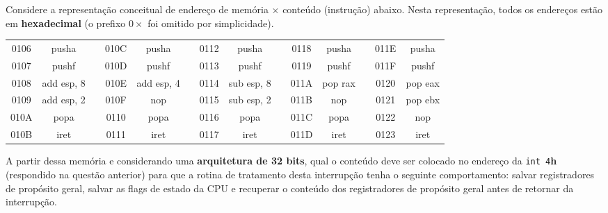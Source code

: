 {\begin{question}{}
Considere a representação conceitual de endereço de memória $\times$ conteúdo (instrução) abaixo. Nesta representação, todos os endereços estão em \textbf{hexadecimal} (o prefixo $0\times$ foi omitido por simplicidade).
\begin{center}
{\ttfamily
\begin{tabular}{|c|c|c|c|c|c|c|c|c|c|c|l|c|c|}
\cline{1-2} \cline{4-5} \cline{7-8} \cline{10-11} \cline{13-14}
0106 & pusha &  & 010C & pusha &  & 0112 & pusha &  & 0118 & pusha &  & 011E & pusha \\ \cline{1-2} \cline{4-5} \cline{7-8} \cline{10-11} \cline{13-14} 
0107 & pushf &  & 010D & pushf &  & 0113 & pushf &  & 0119 & pushf &  & 011F & pushf \\ \cline{1-2} \cline{4-5} \cline{7-8} \cline{10-11} \cline{13-14} 
0108 & add esp, 8 &  & 010E & add esp, 4 &  & 0114 & sub esp, 8 &  & 011A & pop rax &  & 0120 & pop eax \\ \cline{1-2} \cline{4-5} \cline{7-8} \cline{10-11} \cline{13-14} 
0109 & add esp, 2 &  & 010F & nop &  & 0115 & sub esp, 2 &  & 011B & nop &  & 0121 & pop ebx \\ \cline{1-2} \cline{4-5} \cline{7-8} \cline{10-11} \cline{13-14} 
010A & popa &  & 0110 & popa &  & 0116 & popa &  & 011C & popa &  & 0122 & nop \\ \cline{1-2} \cline{4-5} \cline{7-8} \cline{10-11} \cline{13-14} 
010B & iret &  & 0111 & iret &  & 0117 & iret &  & 011D & iret &  & 0123 & iret \\ \cline{1-2} \cline{4-5} \cline{7-8} \cline{10-11} \cline{13-14} 
\end{tabular}%
}
\end{center}

A partir dessa memória e considerando uma \textbf{arquitetura de 32 bits}, qual o conteúdo deve ser colocado no endereço da \texttt{int 4}\textbf{h} (respondido na questão anterior) para que a rotina de tratamento desta interrupção tenha o seguinte comportamento: salvar registradores de propósito geral, salvar as flags de estado da CPU e recuperar o conteúdo dos registradores de propósito geral antes de retornar da interrupção.
\begin{multicols}{5}
\begin{choices}
\end{choices}
\end{multicols}
\end{question}
}